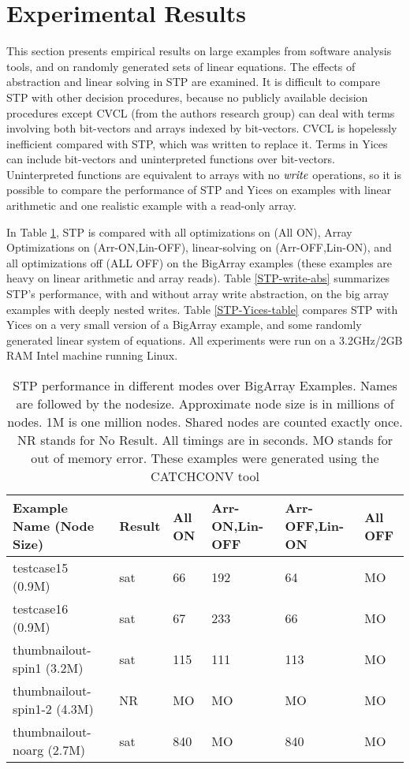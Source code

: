 \section{Experimental Results}

This section presents empirical results on large examples from
software analysis tools, and on randomly generated sets of linear
equations.  The effects of abstraction and linear solving in STP are
examined.  It is difficult to compare STP with other decision
procedures, because no publicly available decision procedures except
CVCL (from the authors research group) can deal with terms involving
both bit-vectors and arrays indexed by bit-vectors.  CVCL is
hopelessly inefficient compared with STP, which was written to replace
it.  Terms in Yices can include bit-vectors and uninterpreted
functions over bit-vectors.  Uninterpreted functions are equivalent to
arrays with no ${\it write}$ operations, so it is possible to compare
the performance of STP and Yices on examples with linear arithmetic
and one realistic example with a read-only array.

In Table
\ref{STP-table}, STP is compared with all optimizations on (All ON),
Array Optimizations on (Arr-ON,Lin-OFF), linear-solving on
(Arr-OFF,Lin-ON), and all optimizations off (ALL OFF) on the BigArray
examples (these examples are heavy on linear arithmetic and array
reads). Table \ref{STP-write-abs} summarizes STP's performance, with and
without array write abstraction, on
the big array examples with deeply nested writes. Table
\ref{STP-Yices-table} compares  STP with Yices on a
very small version of a BigArray example, and some randomly generated
linear system of equations. 
All experiments were run on a 3.2GHz/2GB RAM Intel machine running Linux.

\begin{table}[t]
\begin{center}
\begin{tabular}{|l|l|l|l|l|l|}
\hline
{\bf Example Name (Node Size)} & {\bf Result} & {\bf All ON} & {\bf Arr-ON,Lin-OFF} & {\bf Arr-OFF,Lin-ON} & {\bf All OFF}\\
\hline
testcase15 (0.9M) & sat & 66 & 192 & 64  & MO \\
testcase16 (0.9M) & sat & 67 & 233 & 66  & MO \\
thumbnailout-spin1 (3.2M)& sat & 115 & 111 & 113 & MO \\
thumbnailout-spin1-2 (4.3M)& NR & MO & MO & MO  & MO \\
thumbnailout-noarg (2.7M)& sat & 840 & MO & 840  & MO \\
\hline
\end{tabular}
\end{center}
\caption{STP performance in different modes over BigArray
Examples. Names are followed by the nodesize. Approximate node size is
in millions of nodes. 1M is one million nodes. Shared nodes are
counted exactly once. NR stands for No Result.  All timings are in
seconds. MO stands for out of memory error. These examples were
generated using the CATCHCONV tool}
\label{STP-table}
\end{table}


